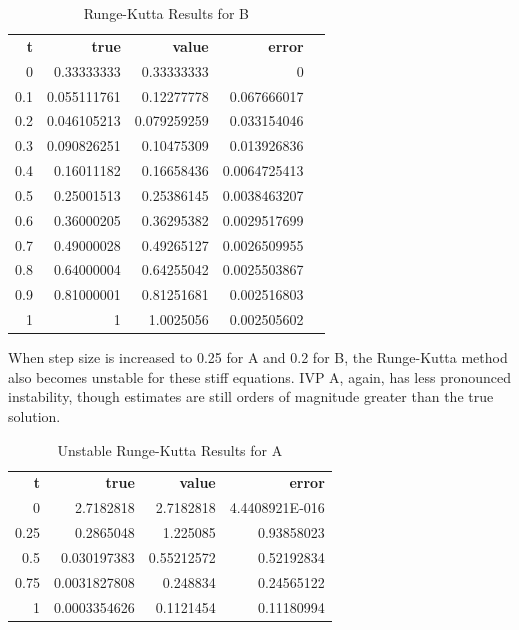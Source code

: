 \documentclass{article}
\begin{document}
\begin{table}[H]
\footnotesize
\centering
\caption{Runge-Kutta Results for B}
\label{tab:b_rk}
\begin{tabular}{rrrrl}
\textbf{t} & \textbf{true} & \textbf{value} & \textbf{error} &  \\
0          & 0.33333333    & 0.33333333     & 0              &  \\
0.1        & 0.055111761   & 0.12277778     & 0.067666017    &  \\
0.2        & 0.046105213   & 0.079259259    & 0.033154046    &  \\
0.3        & 0.090826251   & 0.10475309     & 0.013926836    &  \\
0.4        & 0.16011182    & 0.16658436     & 0.0064725413   &  \\
0.5        & 0.25001513    & 0.25386145     & 0.0038463207   &  \\
0.6        & 0.36000205    & 0.36295382     & 0.0029517699   &  \\
0.7        & 0.49000028    & 0.49265127     & 0.0026509955   &  \\
0.8        & 0.64000004    & 0.64255042     & 0.0025503867   &  \\
0.9        & 0.81000001    & 0.81251681     & 0.002516803    &  \\
1          & 1             & 1.0025056      & 0.002505602    & 
\end{tabular}
\end{table}


When step size is increased to 0.25 for A and 0.2 for B, the Runge-Kutta method also becomes unstable for these stiff equations. IVP A, again, has less pronounced instability, though estimates are still orders of magnitude greater than the true solution.


\begin{table}[H]
\footnotesize
\centering
\caption{Unstable Runge-Kutta Results for A}
\label{tab:un_a_rk}
\begin{tabular}{rrrr}
\textbf{t} & \textbf{true} & \textbf{value} & \textbf{error} \\
0          & 2.7182818     & 2.7182818      & 4.4408921E-016 \\
0.25       & 0.2865048     & 1.225085       & 0.93858023     \\
0.5        & 0.030197383   & 0.55212572     & 0.52192834     \\
0.75       & 0.0031827808  & 0.248834       & 0.24565122     \\
1          & 0.0003354626  & 0.1121454      & 0.11180994        
\end{tabular}
\end{table}
\end{document}
